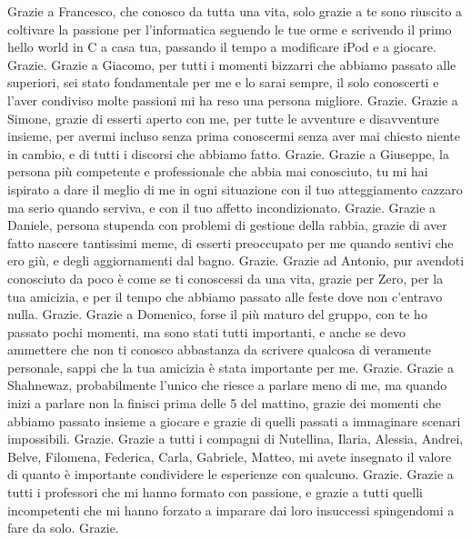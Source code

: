 \documentclass[a4paper,12pt,oneside]{book}
\begin{document}
Grazie a Francesco, che conosco da tutta una vita, solo grazie a te sono riuscito a coltivare la passione per l'informatica seguendo le tue orme e scrivendo il primo hello world in C a casa tua, passando il tempo a modificare iPod e a giocare. Grazie. 
Grazie a Giacomo, per tutti i momenti bizzarri che abbiamo passato alle superiori, sei stato fondamentale per me e lo sarai sempre, il solo conoscerti e l'aver condiviso molte passioni mi ha reso una persona migliore. Grazie. 
Grazie a Simone, grazie di esserti aperto con me, per tutte le avventure e disavventure insieme, per avermi incluso senza prima conoscermi senza aver mai chiesto niente in cambio, e di tutti i discorsi che abbiamo fatto. Grazie. 
Grazie a Giuseppe, la persona più competente e professionale che abbia mai conosciuto, tu mi hai ispirato a dare il meglio di me in ogni situazione con il tuo atteggiamento cazzaro ma serio quando serviva, e con il tuo affetto incondizionato. Grazie. 
Grazie a Daniele, persona stupenda con problemi di gestione della rabbia, grazie di aver fatto nascere tantissimi meme, di esserti preoccupato per me quando sentivi che ero giù, e degli aggiornamenti dal bagno. Grazie. 
Grazie ad Antonio, pur avendoti conosciuto da poco è come se ti conoscessi da una vita, grazie per Zero, per la tua amicizia, e per il tempo che abbiamo passato alle feste dove non c'entravo nulla. Grazie. 
Grazie a Domenico, forse il più maturo del gruppo, con te ho passato pochi momenti, ma sono stati tutti importanti, e anche se devo ammettere che non ti conosco abbastanza da scrivere qualcosa di veramente personale, sappi che la tua amicizia è stata importante per me. Grazie. 
Grazie a Shahnewaz, probabilmente l'unico che riesce a parlare meno di me, ma quando inizi a parlare non la finisci prima delle 5 del mattino, grazie dei momenti che abbiamo passato insieme a giocare e grazie di quelli passati a immaginare scenari impossibili. Grazie. 
Grazie a tutti i compagni di Nutellina, Ilaria, Alessia, Andrei, Belve, Filomena, Federica, Carla, Gabriele, Matteo, mi avete insegnato il valore di quanto è importante condividere le esperienze con qualcuno. Grazie. 
Grazie a tutti i professori che mi hanno formato con passione, e grazie a tutti quelli incompetenti che mi hanno forzato a imparare dai loro insuccessi spingendomi a fare da solo. Grazie.
\end{document}
